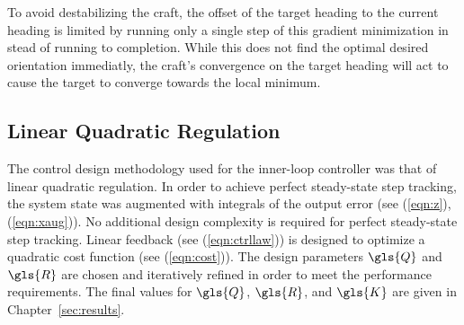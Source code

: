 \documentclass{sydeStyle}
\begin{document}
To avoid destabilizing the craft, the offset of the target heading to the
current heading is limited by running only a single step of this gradient
minimization in stead of running to completion. While this does not find the
optimal desired orientation immediatly, the craft's convergence on the target
heading will act to cause the target to converge towards the local minimum.

\subsection{Linear Quadratic Regulation}
\label{sec:lqr}

The control design methodology used for the inner-loop controller was that of
linear quadratic regulation.  In order to achieve perfect steady-state step
tracking, the system state was augmented with integrals of the output error (see
(\ref{eqn:z}), (\ref{eqn:xaug})).  No additional design complexity is required
for perfect steady-state step tracking.  Linear feedback (see
(\ref{eqn:ctrllaw})) is designed to optimize a quadratic cost function (see
(\ref{eqn:cost})).  The design parameters $\gls{Q}$ and $\gls{R}$ are chosen and
iteratively refined in order to meet the performance requirements.  The final
values for $\gls{Q}$, $\gls{R}$, and $\gls{K}$ are given in
Chapter~\ref{sec:results}.

\end{document}
